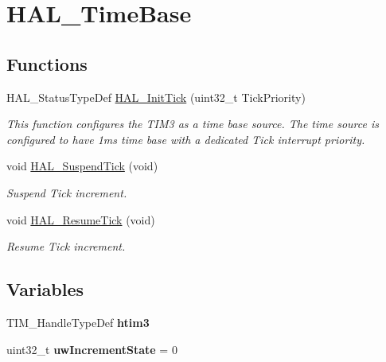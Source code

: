 \hypertarget{group___h_a_l___time_base}{}\section{H\+A\+L\+\_\+\+Time\+Base}
\label{group___h_a_l___time_base}
\subsection*{Functions}
\begin{DoxyCompactItemize}
\item 
H\+A\+L\+\_\+\+Status\+Type\+Def \hyperlink{group___h_a_l___time_base_ga879cdb21ef051eb81ec51c18147397d5}{H\+A\+L\+\_\+\+Init\+Tick} (uint32\+\_\+t Tick\+Priority)
\begin{DoxyCompactList}\small\item\em This function configures the T\+I\+M3 as a time base source. The time source is configured to have 1ms time base with a dedicated Tick interrupt priority. \end{DoxyCompactList}\item 
void \hyperlink{group___h_a_l___time_base_gaaf651af2afe688a991c657f64f8fa5f9}{H\+A\+L\+\_\+\+Suspend\+Tick} (void)
\begin{DoxyCompactList}\small\item\em Suspend Tick increment. \end{DoxyCompactList}\item 
void \hyperlink{group___h_a_l___time_base_ga24e0ee9dae1ec0f9d19200f5575ff790}{H\+A\+L\+\_\+\+Resume\+Tick} (void)
\begin{DoxyCompactList}\small\item\em Resume Tick increment. \end{DoxyCompactList}\end{DoxyCompactItemize}
\subsection*{Variables}
\begin{DoxyCompactItemize}
\item 
\hypertarget{group___h_a_l___time_base_gaac3d2c59ee0e3bbae1b99529a154eb62}{}\label{group___h_a_l___time_base_gaac3d2c59ee0e3bbae1b99529a154eb62} 
T\+I\+M\+\_\+\+Handle\+Type\+Def {\bfseries htim3}
\item 
\hypertarget{group___h_a_l___time_base_gad252e5fa14fe03797c816cfb14962693}{}\label{group___h_a_l___time_base_gad252e5fa14fe03797c816cfb14962693} 
uint32\+\_\+t {\bfseries uw\+Increment\+State} = 0
\end{DoxyCompactItemize}



